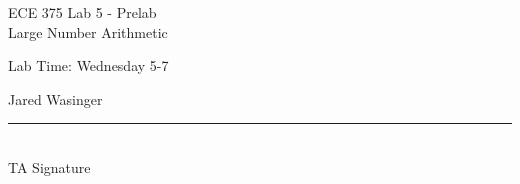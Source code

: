 \documentclass[12pt,letterpaper]{article}
\begin{document}
\begin{titlepage}
    \vspace*{4cm}
    \begin{flushright}
    {\huge
        ECE 375 Lab 5 - Prelab\\[1cm]
    }
    {\large
        Large Number Arithmetic
    }
    \end{flushright}
    \begin{flushleft}
    Lab Time: Wednesday 5-7
    \end{flushleft}
    \begin{flushright}
    Jared Wasinger
    \vfill
    \rule{5in}{.5mm}\\
    TA Signature
    \end{flushright}

\end{titlepage}
\end{document}
